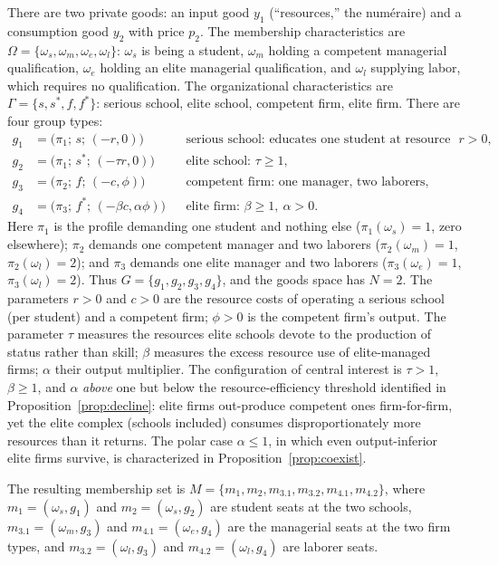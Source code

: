 \documentclass[12pt,letterpaper]{article}
\theoremstyle{definition}
\begin{document}
There are two private goods: an input good $y_1$ (``resources,'' the num\'{e}raire) and a consumption good $y_2$ with price $p_2$.
The membership characteristics are $\Omega=\{\omega_s,\omega_m,\omega_e,\omega_l\}$: $\omega_s$ is being a student, $\omega_m$ holding a competent managerial qualification, $\omega_e$ holding an elite managerial qualification, and $\omega_l$ supplying labor, which requires no qualification.
The organizational characteristics are $\Gamma=\{s,s^\ast,f,f^\ast\}$: serious school, elite school, competent firm, elite firm.
There are four group types:
\begin{align*}
  g_1 &= \big(\pi_1;\, s;\, (-r,0)\big)
    && \text{serious school: educates one student at resource cost } r>0,\\
  g_2 &= \big(\pi_1;\, s^\ast;\, (-\tau r,0)\big)
    && \text{elite school: } \tau\geq 1,\\
  g_3 &= \big(\pi_2;\, f;\, (-c,\phi)\big)
    && \text{competent firm: one manager, two laborers},\\
  g_4 &= \big(\pi_3;\, f^\ast;\, (-\beta c,\alpha\phi)\big)
    && \text{elite firm: } \beta\geq 1,\ \alpha>0.
\end{align*}
Here $\pi_1$ is the profile demanding one student and nothing else ($\pi_1(\omega_s)=1$, zero elsewhere); $\pi_2$ demands one competent manager and two laborers ($\pi_2(\omega_m)=1$, $\pi_2(\omega_l)=2$); and $\pi_3$ demands one elite manager and two laborers ($\pi_3(\omega_e)=1$, $\pi_3(\omega_l)=2$).
Thus $G=\{g_1,g_2,g_3,g_4\}$, and the goods space has $N=2$.
The parameters $r>0$ and $c>0$ are the resource costs of operating a serious school (per student) and a competent firm; $\phi>0$ is the competent firm's output.
The parameter $\tau$ measures the resources elite schools devote to the production of status rather than skill; $\beta$ measures the excess resource use of elite-managed firms; $\alpha$ their output multiplier.
The configuration of central interest is $\tau>1$, $\beta\geq 1$, and $\alpha$ \emph{above} one but below the resource-efficiency threshold identified in Proposition~\ref{prop:decline}: elite firms out-produce competent ones firm-for-firm, yet the elite complex (schools included) consumes disproportionately more resources than it returns.
The polar case $\alpha\leq 1$, in which even output-inferior elite firms survive, is characterized in Proposition~\ref{prop:coexist}.

The resulting membership set is $M=\{m_1,m_2,m_{3.1},m_{3.2},m_{4.1},m_{4.2}\}$, where $m_1=(\omega_s,g_1)$ and $m_2=(\omega_s,g_2)$ are student seats at the two schools, $m_{3.1}=(\omega_m,g_3)$ and $m_{4.1}=(\omega_e,g_4)$ are the managerial seats at the two firm types, and $m_{3.2}=(\omega_l,g_3)$ and $m_{4.2}=(\omega_l,g_4)$ are laborer seats.
\end{document}
